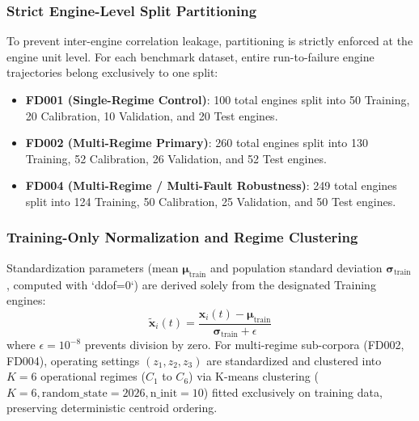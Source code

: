 \documentclass[12pt,a4paper]{article}
\begin{document}
\subsubsection*{Strict Engine-Level Split Partitioning}
To prevent inter-engine correlation leakage, partitioning is strictly enforced at the engine unit level. For each benchmark dataset, entire run-to-failure engine trajectories belong exclusively to one split:
\begin{itemize}
    \item \textbf{FD001 (Single-Regime Control)}: 100 total engines split into 50 Training, 20 Calibration, 10 Validation, and 20 Test engines.
    \item \textbf{FD002 (Multi-Regime Primary)}: 260 total engines split into 130 Training, 52 Calibration, 26 Validation, and 52 Test engines.
    \item \textbf{FD004 (Multi-Regime / Multi-Fault Robustness)}: 249 total engines split into 124 Training, 50 Calibration, 25 Validation, and 50 Test engines.
\end{itemize}

\subsubsection*{Training-Only Normalization and Regime Clustering}
Standardization parameters (mean $\boldsymbol{\mu}_{\text{train}}$ and population standard deviation $\boldsymbol{\sigma}_{\text{train}}$, computed with `ddof=0`) are derived solely from the designated Training engines:
\begin{equation}
\tilde{\mathbf{x}}_i(t) = \frac{\mathbf{x}_i(t) - \boldsymbol{\mu}_{\text{train}}}{\boldsymbol{\sigma}_{\text{train}} + \epsilon}
\end{equation}
where $\epsilon = 10^{-8}$ prevents division by zero. For multi-regime sub-corpora (FD002, FD004), operating settings $(z_1, z_2, z_3)$ are standardized and clustered into $K = 6$ operational regimes ($C_1$ to $C_6$) via K-means clustering ($K = 6, \text{random\_state} = 2026, \text{n\_init} = 10$) fitted exclusively on training data, preserving deterministic centroid ordering.
\end{document}
